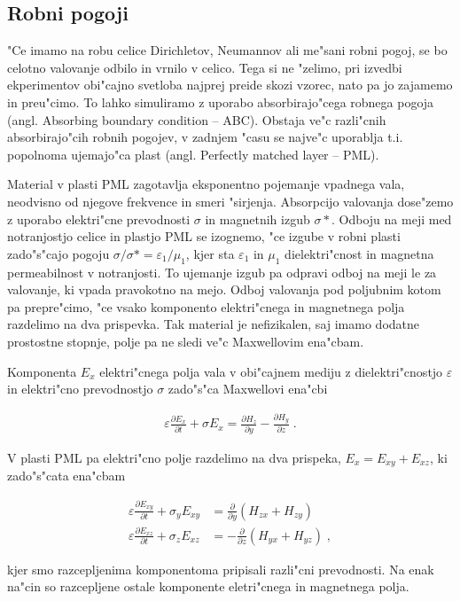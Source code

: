 \documentclass[a4paper,10pt]{article}
\newcommand{\odvod}[2]{\frac{\partial #1}{\partial #2}}
\newcommand{\eps}{\varepsilon}
\begin{document}
\subsection{Robni pogoji}

"Ce imamo na robu celice Dirichletov, Neumannov ali me"sani robni pogoj, se bo celotno valovanje odbilo in vrnilo v celico. 
Tega si ne "zelimo, pri izvedbi ekperimentov obi"cajno svetloba najprej preide skozi vzorec, nato pa jo zajamemo in preu"cimo. 
To lahko simuliramo z uporabo absorbirajo"cega robnega pogoja (angl. Absorbing boundary condition -- ABC). 
Obstaja ve"c razli"cnih absorbirajo"cih robnih pogojev, v zadnjem "casu se najve"c uporablja t.i. popolnoma ujemajo"ca plast (angl. Perfectly matched layer -- PML)\cite{taflove}. 

Material v plasti PML zagotavlja eksponentno pojemanje vpadnega vala, neodvisno od njegove frekvence in smeri "sirjenja. 
Absorpcijo valovanja dose"zemo z uporabo elektri"cne prevodnosti $\sigma$ in magnetnih izgub $\sigma*$. 
Odboju na meji med notranjostjo celice in plastjo PML se izognemo, "ce izgube v robni plasti zado"s"cajo pogoju $\sigma/\sigma* = \eps_1/\mu_1$, kjer sta $\eps_1$ in $\mu_1$ dielektri"cnost in magnetna permeabilnost v notranjosti. 
To ujemanje izgub pa odpravi odboj na meji le za valovanje, ki vpada pravokotno na mejo. 
Odboj valovanja pod poljubnim kotom pa prepre"cimo, "ce vsako komponento elektri"cnega in magnetnega polja razdelimo na dva prispevka. 
Tak material je nefizikalen, saj imamo dodatne prostostne stopnje, polje pa ne sledi ve"c Maxwellovim ena"cbam. 

Komponenta $E_x$ elektri"cnega polja vala v obi"cajnem mediju z dielektri"cnostjo $\eps$ in elektri"cno prevodnostjo $\sigma$ zado"s"ca Maxwellovi ena"cbi

\begin{align}
 \eps \odvod{E_x}{t} + \sigma E_x = \odvod{H_z}{y} - \odvod{H_y}{z}\;.
\end{align}

V plasti PML pa elektri"cno polje razdelimo na dva prispeka, $E_x = E_{xy} + E_{xz}$, ki zado"s"cata ena"cbam

\begin{align}
 \eps \odvod{E_{xy}}{t} + \sigma_y E_{xy} &= \odvod{}{y}(H_{zx} + H_{zy}) \\
 \eps \odvod{E_{xz}}{t} + \sigma_z E_{xz} &= -\odvod{}{z}(H_{yx} + H_{yz})\;,
\end{align}

kjer smo razcepljenima komponentoma pripisali razli"cni prevodnosti. 
Na enak na"cin so razcepljene ostale komponente eletri"cnega in magnetnega polja. 
\end{document}

